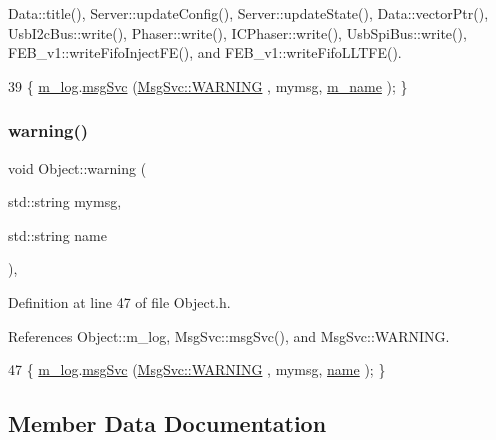 Data\+::title(), Server\+::update\+Config(), Server\+::update\+State(), Data\+::vector\+Ptr(), Usb\+I2c\+Bus\+::write(), Phaser\+::write(), I\+C\+Phaser\+::write(), Usb\+Spi\+Bus\+::write(), F\+E\+B\+\_\+v1\+::write\+Fifo\+Inject\+F\+E(), and F\+E\+B\+\_\+v1\+::write\+Fifo\+L\+L\+T\+F\+E().


\begin{DoxyCode}
39 \{ \hyperlink{classObject_a0d269813dd7ac1f24bc143031e2963f2}{m\_log}.\hyperlink{classMsgSvc_ad25f18047920cc59a314e5098259711c}{msgSvc} (\hyperlink{classMsgSvc_ae671eb7301996cd049d2da8a65925926a7cefae88f2ba26b2b05b676a383c834b}{MsgSvc::WARNING} , mymsg, \hyperlink{classObject_a8b83c95c705d2c3ba0d081fe1710f48d}{m\_name} ); \}
\end{DoxyCode}
\mbox{\label{classObject_a11f101db4dd73d9391b0231818881d86}} 
\subsubsection{\texorpdfstring{warning()}{warning()}\hspace{0.1cm}{\footnotesize\ttfamily [2/2]}}
{\footnotesize\ttfamily void Object\+::warning (\begin{DoxyParamCaption}\item[{std\+::string}]{mymsg,  }\item[{std\+::string}]{name }\end{DoxyParamCaption})\hspace{0.3cm}{\ttfamily [inline]}, {\ttfamily [inherited]}}



Definition at line 47 of file Object.\+h.



References Object\+::m\+\_\+log, Msg\+Svc\+::msg\+Svc(), and Msg\+Svc\+::\+W\+A\+R\+N\+I\+NG.


\begin{DoxyCode}
47 \{ \hyperlink{classObject_a0d269813dd7ac1f24bc143031e2963f2}{m\_log}.\hyperlink{classMsgSvc_ad25f18047920cc59a314e5098259711c}{msgSvc} (\hyperlink{classMsgSvc_ae671eb7301996cd049d2da8a65925926a7cefae88f2ba26b2b05b676a383c834b}{MsgSvc::WARNING} , mymsg, \hyperlink{classObject_a300f4c05dd468c7bb8b3c968868443c1}{name} ); \}
\end{DoxyCode}


\subsection{Member Data Documentation}
\mbox{\label{classLSDelayChipV1_a6fba278fd2ac602c796b5e5cebf2d2de}} 
